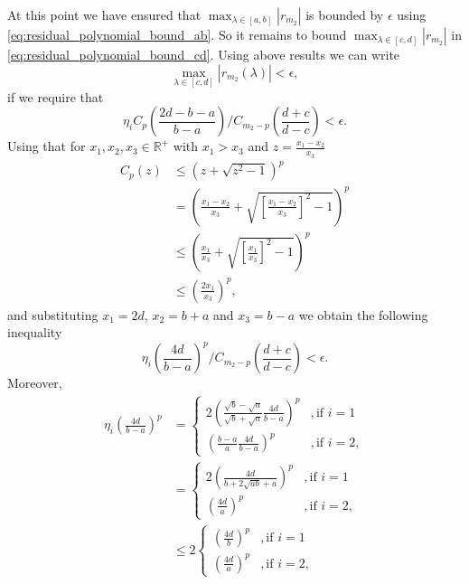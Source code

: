 At this point we have ensured that $\max_{\lambda \in [a,b]}|r_{m_2}|$ is bounded by $\epsilon$ using \cref{eq:residual_polynomial_bound_ab}. So it remains to bound $\max_{\lambda \in [c,d]}|r_{m_2}|$ in \cref{eq:residual_polynomial_bound_cd}. Using above results we can write
\begin{equation*}
    \max_{\lambda \in [c,d]} |r_{m_2}(\lambda)| < \epsilon,
\end{equation*}
if we require that
\begin{equation}
    \eta_i C_{p}\left(\frac{2d - b - a}{b - a}\right) /C_{m_2-p}\left(\frac{d+c}{d-c}\right) < \epsilon.
    \label{eq:relative_error_bound_mp}
\end{equation}
Using that for $x_1, x_2, x_3 \in \mathbb{R}^+$ with $x_1 > x_3$ and $z = \frac{x_1 - x_2}{x_3}$
\begin{align*}
    C_p(z) & \leq \left(z + \sqrt{z^2 - 1}\right)^p                                                    \\
           & = \left( \frac{x_1 - x_2}{x_3} + \sqrt{ \left[\frac{x_1 - x_2}{x_3}\right]^2 -1}\right)^p \\
           & \leq \left( \frac{x_1}{x_3} + \sqrt{ \left[\frac{x_1}{x_3}\right]^2 - 1}\right)^p         \\
           & \leq \left( \frac{2x_1}{x_3}\right)^p,
\end{align*}
and substituting $x_1 = 2d$, $x_2 = b + a$ and $x_3 = b - a$ we obtain the following inequality
\begin{equation}
    \eta_i \left(\frac{4d}{b-a} \right)^p /C_{m_2-p}\left(\frac{d+c}{d-c}\right) < \epsilon.
    \label{eq:chebyshev_degree_p_bound}
\end{equation}
Moreover,
\begin{align*}
    \eta_i \left(\frac{4d}{b-a}\right)^p & =
    \begin{cases}
        2\left(\frac{\sqrt{b} - \sqrt{a}}{\sqrt{b} + \sqrt{a}} \frac{4d}{b-a}\right)^p & , \text{if } i = 1  \\
        \left(\frac{b - a}{a}\frac{4d}{b-a}\right)^p                                   & , \text{if } i = 2,
    \end{cases} \\
                                         & =
    \begin{cases}
        2\left(\frac{4d}{b + 2\sqrt{ab} + a}\right)^p & , \text{if } i = 1  \\
        \left(\frac{4d}{a}\right)^p                   & , \text{if } i = 2,
    \end{cases}                                                                                                                                \\
                                         & \leq 2
    \begin{cases}
        \left(\frac{4d}{b}\right)^p & , \text{if } i = 1  \\
        \left(\frac{4d}{a}\right)^p & , \text{if } i = 2,
    \end{cases}
\end{align*}
